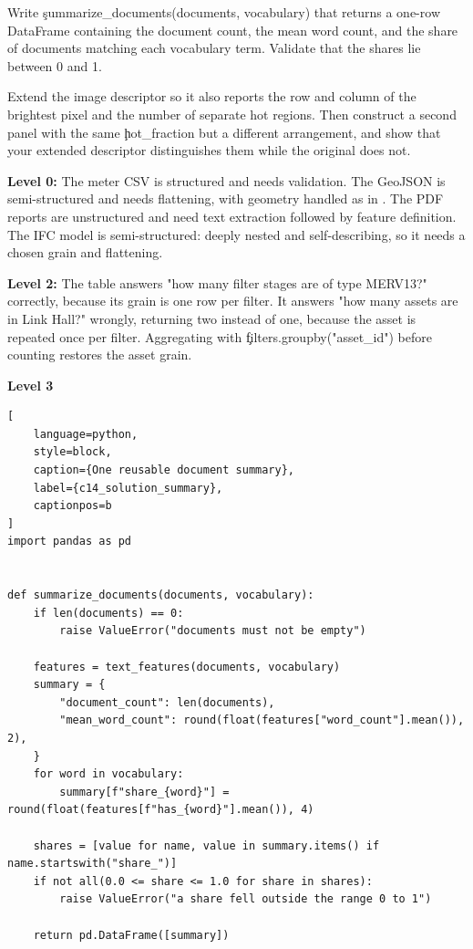 Write \c{summarize_documents(documents, vocabulary)} that returns a one-row
DataFrame containing the document count, the mean word count, and the share of
documents matching each vocabulary term. Validate that the shares lie between 0
and 1.


Extend the image descriptor so it also reports the row and column of the
brightest pixel and the number of separate hot regions. Then construct a second
panel with the same \c{hot_fraction} but a different arrangement, and show that
your extended descriptor distinguishes them while the original does not.


\textbf{Level 0:} The meter CSV is structured and needs validation. The GeoJSON
is semi-structured and needs flattening, with geometry handled as in
. The PDF reports are unstructured and need text
extraction followed by feature definition. The IFC model is semi-structured:
deeply nested and self-describing, so it needs a chosen grain and flattening.

\textbf{Level 2:} The table answers "how many filter stages are of type MERV13?"
correctly, because its grain is one row per filter. It answers "how many assets
are in Link Hall?" wrongly, returning two instead of one, because the asset is
repeated once per filter. Aggregating with
\c{filters.groupby("asset_id")} before counting restores the asset grain.

\textbf{Level 3}

\begin{lstlisting}[
    language=python,
    style=block,
    caption={One reusable document summary},
    label={c14_solution_summary},
    captionpos=b
]
import pandas as pd


def summarize_documents(documents, vocabulary):
    if len(documents) == 0:
        raise ValueError("documents must not be empty")

    features = text_features(documents, vocabulary)
    summary = {
        "document_count": len(documents),
        "mean_word_count": round(float(features["word_count"].mean()), 2),
    }
    for word in vocabulary:
        summary[f"share_{word}"] = round(float(features[f"has_{word}"].mean()), 4)

    shares = [value for name, value in summary.items() if name.startswith("share_")]
    if not all(0.0 <= share <= 1.0 for share in shares):
        raise ValueError("a share fell outside the range 0 to 1")

    return pd.DataFrame([summary])
\end{lstlisting}

